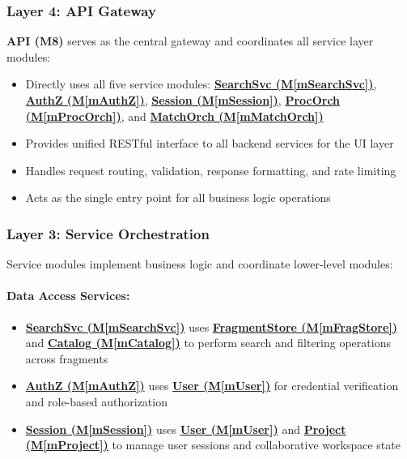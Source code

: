 \documentclass[12pt, titlepage]{article}
\newcommand{\mref}[1]{M\ref{#1}}
\begin{document}
\subsubsection{Layer 4: API Gateway}
\textbf{API (M8)} serves as the central gateway and coordinates all service layer modules:
\begin{itemize}
\item Directly uses all five service modules: \hyperref[mSearchSvc]{\textbf{SearchSvc (\mref{mSearchSvc})}}, \hyperref[mAuthZ]{\textbf{AuthZ (\mref{mAuthZ})}}, \hyperref[mSession]{\textbf{Session (\mref{mSession})}}, \hyperref[mProcOrch]{\textbf{ProcOrch (\mref{mProcOrch})}}, and \hyperref[mMatchOrch]{\textbf{MatchOrch (\mref{mMatchOrch})}}
\item Provides unified RESTful interface to all backend services for the UI layer
\item Handles request routing, validation, response formatting, and rate limiting
\item Acts as the single entry point for all business logic operations
\end{itemize}

\subsubsection{Layer 3: Service Orchestration}
Service modules implement business logic and coordinate lower-level modules:

\paragraph{Data Access Services:}
\begin{itemize}
\item \hyperref[mSearchSvc]{\textbf{SearchSvc (\mref{mSearchSvc})}} uses \hyperref[mFragStore]{\textbf{FragmentStore (\mref{mFragStore})}} and \hyperref[mCatalog]{\textbf{Catalog (\mref{mCatalog})}} to perform search and filtering operations across fragments
\item \hyperref[mAuthZ]{\textbf{AuthZ (\mref{mAuthZ})}} uses \hyperref[mUser]{\textbf{User (\mref{mUser})}} for credential verification and role-based authorization
\item \hyperref[mSession]{\textbf{Session (\mref{mSession})}} uses \hyperref[mUser]{\textbf{User (\mref{mUser})}} and \hyperref[mProject]{\textbf{Project (\mref{mProject})}} to manage user sessions and collaborative workspace state
\end{itemize}
\end{document}
